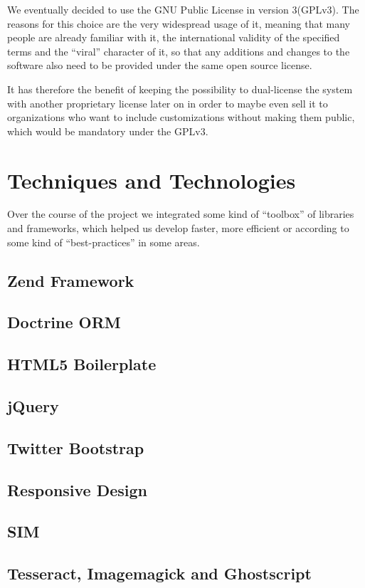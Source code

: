 We eventually decided to use the GNU Public License in version 3(GPLv3). The reasons for this choice are the very widespread usage of it, meaning that many people are already 
familiar with it, the international validity of the specified terms and the \enquote{viral}
character of it, so that any additions and changes to the software also need to be provided 
under the same open source license.

It has therefore the benefit of keeping the possibility to dual-license the system with another proprietary license later on in order to maybe even sell it to organizations who want to include
customizations without making them public, which would be mandatory under the GPLv3.

\section{Techniques and Technologies}

Over the course of the project we integrated some kind of \enquote{toolbox} of libraries and frameworks, which 
helped us develop faster, more efficient or according to some kind of \enquote{best-practices}
in some areas. 

\subsection{Zend Framework}

\subsection{Doctrine ORM}

\subsection{HTML5 Boilerplate}

\subsection{jQuery}

\subsection{Twitter Bootstrap}

\subsection{Responsive Design}

\subsection{SIM}

\subsection{Tesseract, Imagemagick and Ghostscript}


